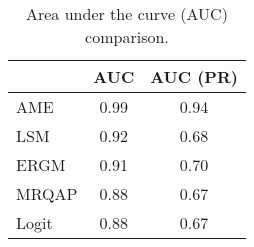 \begin{table}[ht]
\centering
\begingroup\normalsize
\begin{tabular}{lcc}
  & AUC & AUC (PR) \\ 
  \hline
\hline
AME & 0.99 & 0.94 \\ 
  LSM & 0.92 & 0.68 \\ 
  ERGM & 0.91 & 0.70 \\ 
  MRQAP & 0.88 & 0.67 \\ 
  Logit & 0.88 & 0.67 \\ 
  \end{tabular}
\endgroup
\caption{Area under the curve (AUC) comparison.} 
\label{tab:aucTable}
\end{table}
